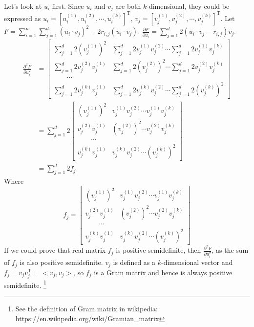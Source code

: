 \documentclass[twoside,11pt]{homework}
\begin{document}
Let's look at $u_i$ first.
Since $u_i$ and $v_j$ are both $k$-dimensional, they could be expressed as $u_i = [u_i^{(1)}, u_i^{(2)}, \cdots, u_i^{(k)}]^{\mathrm{T}}$, $v_j = [v_j^{(1)}, v_j^{(2)}, \cdots, v_j^{(k)}]^{\mathrm{T}}$.
Let $F = \sum\limits_{i=1}^n \sum\limits_{j=1}^d (u_i \cdot v_j)^2 - 2r_{i, j} (u_i \cdot v_j)$.
$\frac{\partial F}{\partial u_i} = \sum\limits_{j=1}^d 2(u_i \cdot v_j- r_{i, j})  v_j$.
%
\begin{equation}
\begin{split}
\frac{\partial^2 F}{\partial u_i ^2} &= \left [ 
						 \begin{matrix}
						 	\sum\limits_{j=1}^d 2(v_j^{(1)})^2 & \sum\limits_{j=1}^d 2v_j^{(1)}v_j^{(2)}	   \cdots \sum\limits_{j=1}^d 2v_j^{(1)}v_j^{(k)}   \\
							\sum\limits_{j=1}^d 2v_j^{(2)}v_j^{(1)} & \sum\limits_{j=1}^d 2(v_j^{(2)})^2	   \cdots \sum\limits_{j=1}^d 2v_j^{(2)}v_j^{(k)} \\
							\qquad \cdots \\
							\sum\limits_{j=1}^d 2v_j^{(k)}v_j^{(1)} & \sum\limits_{j=1}^d 2v_j^{(k)}v_j^{(2)}	   \cdots \sum\limits_{j=1}^d 2(v_j^{(k)})^2
						 \end{matrix}
						\right ] \\
					    &=\sum\limits_{j=1}^d 2\left [ 
						 \begin{matrix}
						 	 (v_j^{(1)})^2 &  v_j^{(1)}v_j^{(2)}   \cdots  v_j^{(1)}v_j^{(k)}   \\
							 v_j^{(2)}v_j^{(1)} & (v_j^{(2)})^2	   \cdots v_j^{(2)}v_j^{(k)} \\
							\qquad  \cdots \\
							v_j^{(k)}v_j^{(1)} & v_j^{(k)}v_j^{(2)}	   \cdots (v_j^{(k)})^2
						 \end{matrix}
						\right ] \\
					     &= \sum\limits_{j=1}^d 2f_j
\end{split}
\end{equation}
%
Where 
%
\begin{equation}
f_j = \left [ 
						 \begin{matrix}
						 	 (v_j^{(1)})^2 &  v_j^{(1)}v_j^{(2)}   \cdots  v_j^{(1)}v_j^{(k)}   \\
							 v_j^{(2)}v_j^{(1)} & (v_j^{(2)})^2	   \cdots v_j^{(2)}v_j^{(k)} \\
							\qquad  \cdots \\
							v_j^{(k)}v_j^{(1)} & v_j^{(k)}v_j^{(2)}	   \cdots (v_j^{(k)})^2
						 \end{matrix}
						\right ] 
\end{equation}
%
If we could prove that real matrix $f_j$ is positive semidefinite, then $\frac{\partial^2 F}{\partial u_i ^2}$, as the sum of $f_j$ is also positive semidefinite.
$v_j$ is defined as a $k$-dimensional vector and $f_j = v_j v_j^{\mathrm{T}} = <v_j, v_j>$, so $f_j$ is a Gram matrix and hence is always positive semidefinite.
\footnote{
See the definition of Gram matrix in wikipedia:
https://en.wikipedia.org/wiki/Gramian\_matrix}
\end{document}
